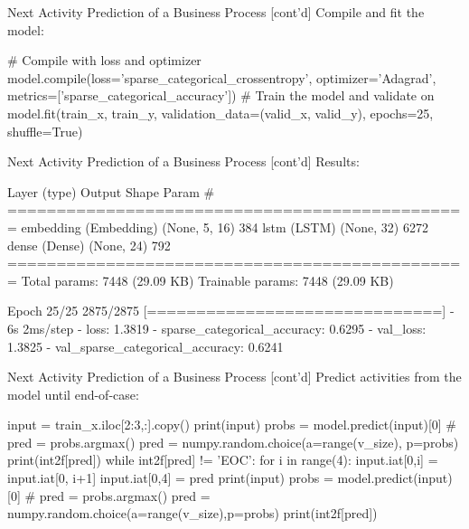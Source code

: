 \documentclass[ignorenonframetext,xcolor=x11names]{beamer}
\begin{document}
\begin{frame}[fragile]{Next Activity Prediction of a Business Process \small [cont'd]}
Compile and fit the model:
\begin{pythoncode}
# Compile with loss and optimizer
model.compile(loss='sparse_categorical_crossentropy',
              optimizer='Adagrad',
              metrics=['sparse_categorical_accuracy'])
# Train the model and validate on
model.fit(train_x, train_y,
          validation_data=(valid_x, valid_y),
          epochs=25, shuffle=True)
\end{pythoncode}
\end{frame}

\begin{frame}[fragile]{Next Activity Prediction of a Business Process \small [cont'd]}
Results:
\begin{textcode}
 Layer (type)           Output Shape    Param #   
===============================================
 embedding (Embedding)  (None, 5, 16)   384       
 lstm (LSTM)            (None, 32)      6272      
 dense (Dense)          (None, 24)      792                                                                        
===============================================
Total params: 7448 (29.09 KB)
Trainable params: 7448 (29.09 KB)

Epoch 25/25
2875/2875 [==============================] - 6s 2ms/step 
- loss: 1.3819 - sparse_categorical_accuracy: 0.6295 
- val_loss: 1.3825 - val_sparse_categorical_accuracy: 0.6241
\end{textcode}
\end{frame}

\begin{frame}[fragile]{Next Activity Prediction of a Business Process \small [cont'd]}
Predict activities from the model until end-of-case:
\begin{pythoncode}
input = train_x.iloc[2:3,:].copy()
print(input)
probs = model.predict(input)[0]
# pred = probs.argmax()
pred = numpy.random.choice(a=range(v_size), p=probs)
print(int2f[pred])
while int2f[pred] != 'EOC':
    for i in range(4):
        input.iat[0,i] = input.iat[0, i+1]
    input.iat[0,4] = pred
    print(input)
    probs = model.predict(input)[0]
    # pred = probs.argmax()
    pred = numpy.random.choice(a=range(v_size),p=probs)
    print(int2f[pred])
\end{pythoncode}
\end{frame}
\end{document}
